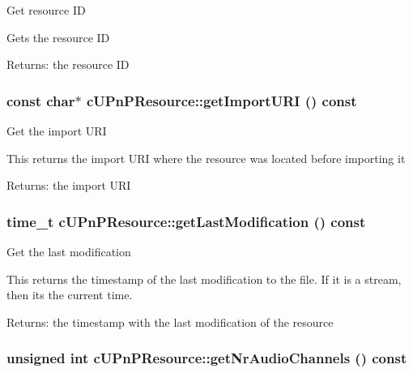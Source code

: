 Get resource ID

Gets the resource ID

\begin{Desc}
\item[Returns:]the resource ID \end{Desc}
\hypertarget{classcUPnPResource_04ab0d214e39ddfa18339926cef9fd64}{
\subsubsection[{getImportURI}]{\setlength{\rightskip}{0pt plus 5cm}const char$\ast$ cUPnPResource::getImportURI () const}}
\label{classcUPnPResource_04ab0d214e39ddfa18339926cef9fd64}


Get the import URI

This returns the import URI where the resource was located before importing it

\begin{Desc}
\item[Returns:]the import URI \end{Desc}
\hypertarget{classcUPnPResource_c95a8fe0bdba2c371a46e4e267dab1aa}{
\subsubsection[{getLastModification}]{\setlength{\rightskip}{0pt plus 5cm}time\_\-t cUPnPResource::getLastModification () const}}
\label{classcUPnPResource_c95a8fe0bdba2c371a46e4e267dab1aa}


Get the last modification

This returns the timestamp of the last modification to the file. If it is a stream, then its the current time.

\begin{Desc}
\item[Returns:]the timestamp with the last modification of the resource \end{Desc}
\hypertarget{classcUPnPResource_ff18e089f421d710580292f0b91b40f8}{
\subsubsection[{getNrAudioChannels}]{\setlength{\rightskip}{0pt plus 5cm}unsigned int cUPnPResource::getNrAudioChannels () const}}
\label{classcUPnPResource_ff18e089f421d710580292f0b91b40f8}


